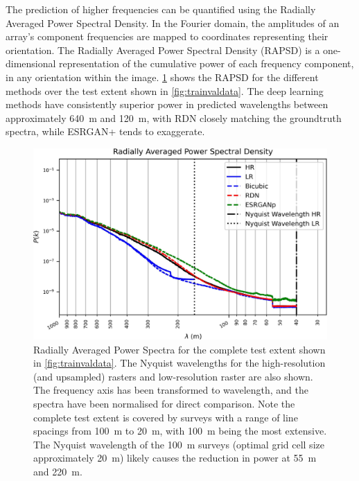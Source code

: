 \documentclass[manuscript.tex]{subfiles}
\begin{document}
The prediction of higher frequencies can be quantified using the Radially Averaged Power Spectral Density.
In the Fourier domain, the amplitudes of an array's component frequencies are mapped to coordinates representing their orientation.
The Radially Averaged Power Spectral Density (RAPSD) \parencite{ulichneyDitheringBlueNoise1988} is a one-dimensional representation of the cumulative power of each frequency component, in any orientation within the image.
\cref{fig:rapsd} shows the RAPSD for the different methods over the test extent shown in \cref{fig:trainvaldata}. The deep learning methods have consistently superior power in predicted wavelengths between approximately \SI{640}{\metre} and \SI{120}{\metre}, with RDN\textdaggerdbl{} closely matching the groundtruth spectra, while ESRGAN+ tends to exaggerate.


\begin{figure}[hbt]
    \includegraphics[width=\linewidth]{fig/p1/rapsd.jpg}
    \caption[short]{Radially Averaged Power Spectra for the complete test extent shown in \cref{fig:trainvaldata}.
        The Nyquist wavelengths for the high-resolution (and upsampled) rasters and low-resolution raster are also shown.
        The frequency axis has been transformed to wavelength, and the spectra have been normalised for direct comparison.
        Note the complete test extent is covered by surveys with a range of line spacings from \SI{100}{\metre} to \SI{20}{\metre}, with \SI{100}{\metre} being the most extensive.
        The Nyquist wavelength of the \SI{100}{\metre} surveys (optimal grid cell size approximately \SI{20}{\metre}) likely causes the reduction in power at \SI{55}{\metre} and \SI{220}{\metre}.
    }
    \label{fig:rapsd}
\end{figure}
\end{document}
